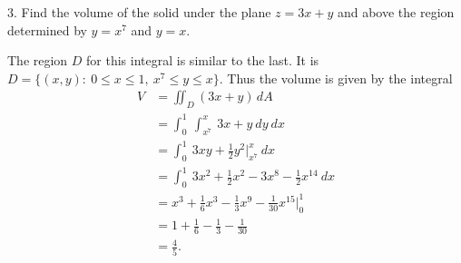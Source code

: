 \documentclass{report}
\begin{document}
    \pagebreak 
    \begin{mdframed}
        3. Find the volume of the solid under the plane $z = 3x + y$ and above the region determined by $y = x^{7}$ and $y = x$.
    \end{mdframed}
    \bigbreak \noindent 
    The region $D$ for this integral is similar to the last. It is $D = \{(x,y):\ 0 \leq x \leq 1,\ x^{7} \leq y \leq x\} $. Thus the volume is given by the integral
    \begin{align*}
        V &= \iint_{D}(3x+y)\, dA \\
          &= \int_{0}^{1}\ \int_{x^{7}}^{x}\ 3x+y\ dy\ dx \\
          &= \int_{0}^{1}\ 3xy + \frac{1}{2}y^{2}\bigg|^{x}_{x^{7}}\ dx \\
          &=\int_{0}^{1}\ 3x^{2}+\frac{1}{2}x^{2}-3x^{8}-\frac{1}{2}x^{14}\ dx \\
          &=x^{3}+\frac{1}{6}x^{3} -\frac{1}{3}x^{9}-\frac{1}{30}x^{15}\bigg|^{1}_{0} \\
          &=1+\frac{1}{6}-\frac{1}{3}-\frac{1}{30} \\
          &=\frac{4}{5}
    .\end{align*}
\end{document}
